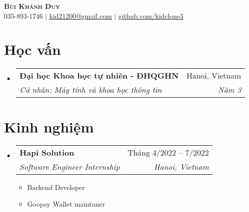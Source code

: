 \documentclass[letterpaper,11pt]{article}
\makeatletter
\newcommand{\resumeItem}[1]{
  \item\small{
    {#1 \vspace{-2pt}}
  }
}
\newcommand{\resumeSubheading}[4]{
  \vspace{-2pt}\item
    \begin{tabular*}{0.97\textwidth}[t]{l@{\extracolsep{\fill}}r}
      \textbf{#1} & #2 \\
      \textit{\small#3} & \textit{\small #4} \\
    \end{tabular*}\vspace{-7pt}
}
\newcommand{\resumeSubHeadingListStart}{\begin{itemize}[leftmargin=0.15in, label={}]}
\newcommand{\resumeSubHeadingListEnd}{\end{itemize}}
\newcommand{\resumeItemListStart}{\begin{itemize}}
\newcommand{\resumeItemListEnd}{\end{itemize}\vspace{-5pt}}
\makeatother
\begin{document}


\begin{center}
    \textbf{\Huge \scshape Bùi Khánh Duy} \\ \vspace{7pt}
    \small 035-893-1746 $|$ \href{mailto:kid21200@gmail.com}{\underline{kid21200@gmail.com}} $|$
    \href{https://github.com/kidclone3}{\underline{github.com/kidclone3}}
    \\\vspace{7pt}
\end{center}


\section{Học vấn}
  \resumeSubHeadingListStart
    \resumeSubheading
      {Đại học Khoa học tự nhiên - ĐHQGHN}{Hanoi, Vietnam}
      {Cử nhân: Máy tính và khoa học thông tin}{Năm 3}
            

  \resumeSubHeadingListEnd

\section{Kinh nghiệm}
  \resumeSubHeadingListStart

    \resumeSubheading
      {Hapi Solution}{Tháng 4/2022 – 7/2022}
      {Software Engineer Internship}{Hanoi, Vietnam}
      \resumeItemListStart
        \resumeItem{Backend Developer}
        \resumeItem{Goopay Wallet maintaner}
      \resumeItemListEnd
      
      
     
    \resumeSubHeadingListEnd
\end{document}
